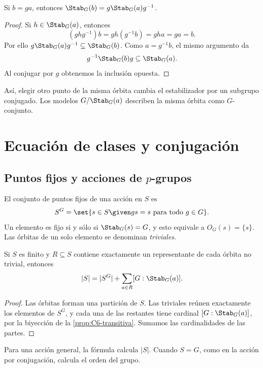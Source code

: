 \begin{prop}\label{prop:C6-estabilizadores}
Si $b=ga$, entonces $\Stab_G(b)=g\Stab_G(a)g^{-1}$.
\end{prop}
\begin{proof}
Si $h\in\Stab_G(a)$, entonces
\[
(ghg^{-1})b=gh(g^{-1}b)=gha=ga=b.
\]
Por ello $g\Stab_G(a)g^{-1}\subseteq\Stab_G(b)$. Como $a=g^{-1}b$, el mismo argumento da
\[
g^{-1}\Stab_G(b)g\subseteq\Stab_G(a).
\]
Al conjugar por $g$ obtenemos la inclusión opuesta.
\end{proof}
Así, elegir otro punto de la misma órbita cambia el estabilizador por un subgrupo conjugado. Los modelos $G/\Stab_G(a)$ describen la misma órbita como $G$-conjunto.

\section{Ecuación de clases y conjugación}
\subsection{Puntos fijos y acciones de \texorpdfstring{$p$}{p}-grupos}
El conjunto de puntos fijos de una acción en $S$ es
\[
S^G=\set{s\in S\given gs=s\text{ para todo }g\in G}.
\]
Un elemento es fijo si y sólo si $\Stab_G(s)=G$, y esto equivale a $O_G(s)=\{s\}$. Las órbitas de un solo elemento se denominan \emph{triviales}.

\begin{prop}\label{prop:C6-ecuacion}
Si $S$ es finito y $R\subseteq S$ contiene exactamente un representante de cada órbita no trivial, entonces
\[
|S|=|S^G|+\sum_{a\in R}[G:\Stab_G(a)].
\]
\end{prop}
\begin{proof}
Las órbitas forman una partición de $S$. Las triviales reúnen exactamente los elementos de $S^G$, y cada una de las restantes tiene cardinal $[G:\Stab_G(a)]$, por la biyección de la \cref{prop:C6-transitiva}. Sumamos las cardinalidades de las partes.
\end{proof}
\begin{obs}
Para una acción general, la fórmula calcula $|S|$. Cuando $S=G$, como en la acción por conjugación, calcula el orden del grupo.
\end{obs}

